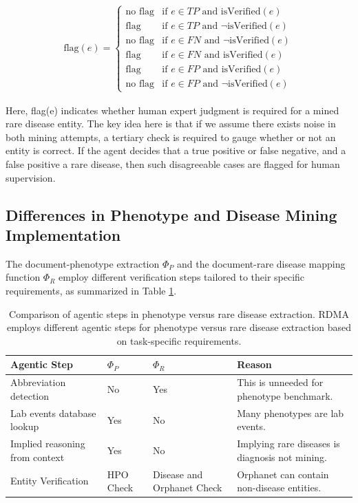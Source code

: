 \begin{align}
\text{flag}(e) = 
\begin{cases}
\text{no flag} & \text{if } e \in TP \text{ and isVerified}(e) \\
\text{flag} & \text{if } e \in TP \text{ and } \neg\text{isVerified}(e) \\
\text{no flag} & \text{if } e \in FN \text{ and } \neg\text{isVerified}(e) \\
\text{flag} & \text{if } e \in FN \text{ and isVerified}(e) \\
\text{flag} & \text{if } e \in FP \text{ and isVerified}(e) \\
\text{no flag} & \text{if } e \in FP \text{ and } \neg\text{isVerified}(e)
\end{cases}
\end{align}

Here, flag(e) indicates whether human expert judgment is required for a mined rare disease entity. The key idea here is that if we assume there exists noise in both mining attempts, a tertiary check is required to gauge whether or not an entity is correct. If the agent decides that a true positive or false negative, and a false positive a rare disease, then such disagreeable cases are flagged for human supervision.

\subsection{Differences in Phenotype and Disease Mining Implementation} \label{sec: Methodology: diff_pheno_dis_ex}
The document-phenotype extraction $\Phi_P$ and the document-rare disease mapping function $\Phi_R$ employ different verification steps tailored to their specific requirements, as summarized in Table \ref{tab:extraction_steps_comparison_ex}.

\begin{table}[h]
\centering
\begin{tabular}{|p{}|p{}|p{}|p{}|}
\hline
\textbf{Agentic Step} & \textbf{$\Phi_P$} & \textbf{$\Phi_R$} & \textbf{Reason} \\
\hline
Abbreviation detection & No & Yes & This is unneeded for phenotype benchmark. \\
\hline
Lab events database lookup & Yes & No & Many phenotypes are lab events. \\
\hline
Implied reasoning from context & Yes & No & Implying rare diseases is diagnosis not mining. \\
\hline
Entity Verification & HPO Check & Disease and Orphanet Check & Orphanet can contain non-disease entities. \\
\hline
\end{tabular}
\caption{Comparison of agentic steps in phenotype versus rare disease extraction. RDMA employs different agentic steps for phenotype versus rare disease extraction based on task-specific requirements.}
\label{tab:extraction_steps_comparison_ex}
\end{table}

